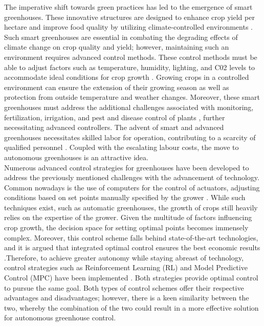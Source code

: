 The imperative shift towards green practices has led to the emergence of smart greenhouses. These innovative structures are designed to enhance crop yield per hectare and improve food quality by utilizing climate-controlled environments \cite{morcegoReinforcementLearningModel2023}. Such smart greenhouses are essential in combating the degrading effects of climate change on crop quality and yield; however, maintaining such an environment requires advanced control methods. These control methods must be able to adjust factors such as temperature, humidity, lighting, and C02 levels to accommodate ideal conditions for crop growth \cite{devopsGreenhouseClimateControl2021}. Growing crops in a controlled environment can ensure the extension of their growing season as well as protection from outside temperature and weather changes. Moreover, these smart greenhouses must address the additional challenges associated with monitoring, fertilization, irrigation, and pest and disease control of plants \cite{sahooSmartGreenhouseBoon2022}, further necessitating advanced controllers. The advent of smart and advanced greenhouses necessitates skilled labor for operation, contributing to a scarcity of qualified personnel \cite{rusnakWhatCurrentState2018}. Coupled with the escalating labour costs, the move to autonomous greenhouses is an attractive idea. \\


Numerous advanced control strategies for greenhouses have been developed to address the previously mentioned challenges with the advancement of technology. Common nowadays is the use of computers for the control of actuators, adjusting conditions based on set points manually specified by the grower \cite{zhangMethodologiesControlStrategies2020}. While such techniques exist, such as automatic greenhouses, the growth of crops still heavily relies on the expertise of the grower. Given the multitude of factors influencing crop growth, the decision space for setting optimal points becomes immensely complex.  Moreover, this control scheme falls behind state-of-the-art technologies, and it is argued that integrated optimal control ensures the best economic results \cite{vanstratenOptimalGreenhouseCultivation2010}.Therefore, to achieve greater autonomy while staying abreast of technology, control strategies such as Reinforcement Learning (RL) and Model Predictive Control (MPC) have been implemented \cite{zhangMethodologiesControlStrategies2020}. Both strategies provide optimal control to pursue the same goal.  Both types of control schemes offer their respective advantages and disadvantages; however, there is a keen similarity between the two, whereby the combination of the two could result in a more effective solution for autonomous greenhouse control.

